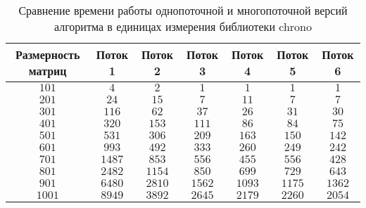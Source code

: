 \documentclass[12pt, a4paper]{report}
\begin{document}
\begin{table}[ht!]
	\caption{Сравнение времени работы однопоточной и многопоточной версий алгоритма в единицах измерения библиотеки chrono}
	\label{table2}
	\begin{center}
		\begin{tabular}{|c|c|c|c|c|c|c|}
			\hline
			\bf{Размерность матриц} & \bf{Поток 1} & \bf{Поток 2} & \bf{Поток 3} & \bf{Поток 4} & \bf{Поток 5} & \bf{Поток 6} \\\hline
			
			$101$ & $4$ & $2$ & $1$ & $1$ & $1$ & $1$\\\hline
			
			$201$ & $24$ & $15$ & $7$ & $11$ & $7$ & $7$\\\hline
			
			$301$ & $116$ & $62$ & $37$ & $26$ & $31$ & $30$\\\hline
			
			$401$ & $320$ & $153$ & $111$ & $86$ & $84$ & $75$\\\hline
			
			$501$ & $531$ & $306$ & $209$ & $163$ & $150$ & $142$\\\hline
			
			$601$ & $993$ & $492$ & $333$ & $260$ & $249$ & $242$\\\hline
			
			$701$ & $1487$ & $853$ & $556$ & $455$ & $556$ & $428$\\\hline
			
			$801$ & $2482$ & $1154$ & $850$ & $699$ & $729$ & $643$\\\hline
			
			$901$ & $6480$ & $2810$ & $1562$ & $1093$ & $1175$ & $1362$ \\\hline
			
			$1001$ & $8949$ & $3892$ & $2645$ & $2179$ & $2260$ & $2054$\\\hline
		\end{tabular}
	\end{center}
\end{table}

	
\end{document}
